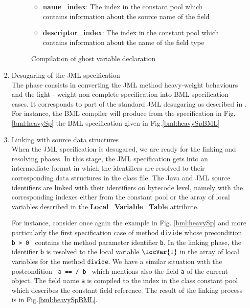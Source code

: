 \begin{enumerate}
\begin{figure}[ht!]
\begin{frameit}
\begin{itemize}
\item \textbf{name\_index}:  The index in the constant pool which contains information about the source name of the field

\item \textbf{descriptor\_index}: The index in the constant pool which contains information about the name of the field type  
\end{itemize}


\caption{\sc Compilation of ghost variable declaration}
\label{bml:compiler:ghost}
\end{frameit}
\end{figure}

\item Desugaring of the JML specification \\
      The phase consists in converting the JML method heavy-weight behaviours and the light - weight non complete
      specification into BML specification cases.
      It corresponds to part of the standard JML desugaring as described  in \cite{RT03djml}.
      For instance, the BML compiler will produce from the specification in Fig.\ref{bml:heavySp} the BML specification 
      given in Fig.\ref{bml:heavySpBML} 
      



\item Linking with source data structures \\
      When the JML specification is desugared, we are ready for the linking and resolving phases.
      In this stage, the JML specification gets into an intermediate format in which 
      the identifiers are resolved to their corresponding data structures in the class file.
      The Java and JML source identifiers are linked with their identifiers on bytecode level, 
      namely with the corresponding indexes either from the constant pool or the array of 
      local variables described in the \textbf{Local\_Variable\_Table} attribute. 

      For instance, consider once again the example in Fig. \ref{bml:heavySp} and more particularly  the first specification
      case of method \texttt{divide}  whose precondition \texttt{ b > 0 }  contains the method parameter identifier \texttt{b}.
      In the linking phase, the identifier \texttt{b} is resolved to the local variable $\locVar{1}$  in the array of
      local variables for the method \texttt{divide}.
      We have a similar situation with the postcondition \texttt{ a ==  / b }  which mentions also the field \texttt{a} of the current object.
      The field name \texttt{a} is compiled to the index in the class constant pool  which describes the constant field reference.
      The result of the linking process is in Fig.\ref{bml:heavySpBML}.


\end{enumerate}
